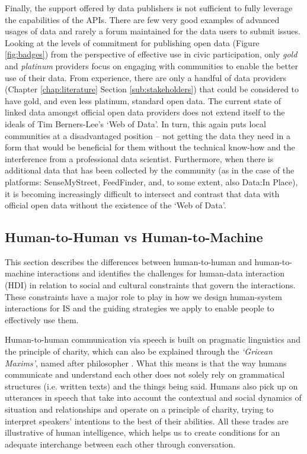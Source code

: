 Finally, the support offered by data publishers is not sufficient to fully leverage the capabilities of the APIs. There are few very good examples of advanced usages of data and rarely a forum maintained for the data users to submit issues. Looking at the levels of commitment for publishing open data (Figure \ref{fig:badges}) from the perspective of effective use \citep{gurstein_open_2011} in civic participation, only \textit{gold} and \textit{platinum} providers focus on engaging with communities to enable the better use of their data. From experience, there are only a handful of data providers (Chapter \ref{chap:literature} Section \ref{sub:stakeholders}) that could be considered to have gold, and even less platinum, standard open data. The current state of linked data amongst official open data providers does not extend itself to the ideals of Tim Berners-Lee's `Web of Data'. In turn, this again puts local communities at a disadvantaged position -- not getting the data they need in a form that would be beneficial for them without the technical know-how and the interference from a professional data scientist. Furthermore, when there is additional data that has been collected by the community (as in the case of the platforms: SenseMyStreet, FeedFinder, and, to some extent, also Data:In Place), it is becoming increasingly difficult to intersect and contrast that data with official open data without the existence of the `Web of Data'.

\subsection{Human-to-Human vs Human-to-Machine}
\label{sub:human_machine}
This section describes the differences between human-to-human and human-to-machine interactions and identifies the challenges for human-data interaction (HDI) in relation to social and cultural constraints that govern the interactions. These constraints have a major role to play in how we design human-system interactions for IS and the guiding strategies we apply to enable people to effectively use them.
\newline

Human-to-human communication via speech is built on pragmatic linguistics and the principle of charity, which can also be explained through the \textit{`Gricean Maxims'}, named after philosopher \citet{herbert_paul_grice_logic_1975}. What this means is that the way humans communicate and understand each other does not solely rely on grammatical structures (i.e. written texts) and the things being said. Humans also pick up on utterances in speech that take into account the contextual and social dynamics of situation and relationships and operate on a principle of charity, trying to interpret speakers' intentions to the best of their abilities. All these trades are illustrative of human intelligence, which helps us to create conditions for an adequate interchange between each other through conversation.


